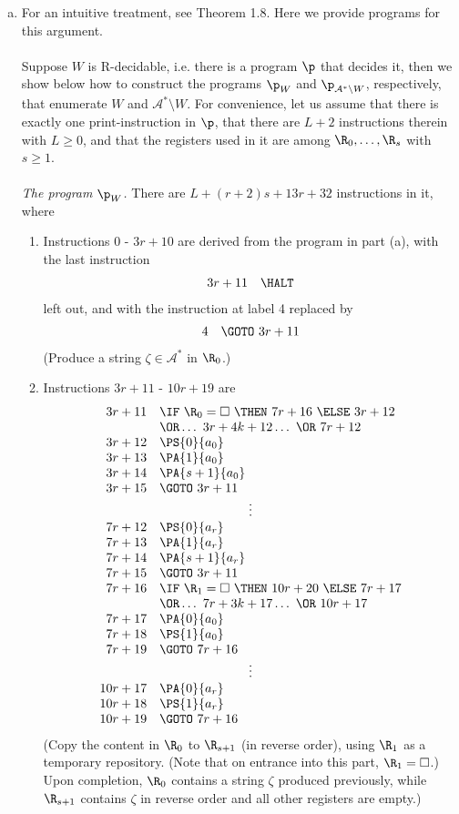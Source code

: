 \begin{enumerate}[1.]
\begin{enumerate}[(a)]
\item For an intuitive treatment, see Theorem 1.8. Here we provide programs for this argument.\\
\ \\
Suppose $W$ is R-decidable, i.e. there is a program $\p$ that decides it, then we show below how to construct the programs $\p_W$ and $\p_{\mathcal{A}^\ast \setminus W}$, respectively, that enumerate $W$ and $\mathcal{A}^\ast \setminus W$. For convenience, let us assume that there is exactly one print-instruction in $\p$, that there are $L + 2$ instructions therein with $L \geq 0$, and that the registers used in it are among $\R_0, \ldots, \R_s$ with $s \geq 1$.\\
\ \\
\emph{The program $\p_W$.} There are $L + (r + 2)s + 13r + 32$ instructions in it, where
\begin{enumerate}[(1)]
\item Instructions $0$ - $3r + 10$ are derived from the program in part (a), with the last instruction
\[
\begin{array}{rl}
3r + 11 & \HALT
\end{array}
\]
left out, and with the instruction at label 4 replaced by
\[
\begin{array}{rl}
4 & \GOTO \ 3r + 11
\end{array}
\]
(Produce a string $\zeta \in \mathcal{A}^\ast$ in $\R_0$.)
\item Instructions $3r + 11$ - $10r + 19$ are
\[
\begin{array}{rl}
3r + 11 & \IF \ \R_0 = \Box \ \THEN \ 7r + 16 \ \ELSE \ 3r + 12 \cr
\ & \OR \ldots \ 3r + 4k + 12 \ldots \ \OR \ 7r + 12 \cr
3r + 12 & \PS{0}{a_0} \cr
3r + 13 & \PA{1}{a_0} \cr
3r + 14 & \PA{s + 1}{a_0} \cr
3r + 15 & \GOTO \ 3r + 11 \cr
\multicolumn{2}{c}{\vdots} \cr
7r + 12 & \PS{0}{a_r} \cr
7r + 13 & \PA{1}{a_r} \cr
7r + 14 & \PA{s + 1}{a_r} \cr
7r + 15 & \GOTO \ 3r + 11 \cr
7r + 16 & \IF \ \R_1 = \Box \ \THEN \ 10r + 20 \ \ELSE \ 7r + 17 \cr
\ & \OR \ldots \ 7r + 3k + 17 \ldots \ \OR \ 10r + 17 \cr
7r + 17 & \PA{0}{a_0} \cr
7r + 18 & \PS{1}{a_0} \cr
7r + 19 & \GOTO \ 7r + 16 \cr
\multicolumn{2}{c}{\vdots} \cr
10r + 17 & \PA{0}{a_r} \cr
10r + 18 & \PS{1}{a_r} \cr
10r + 19 & \GOTO \ 7r + 16 \cr
\end{array}
\]
(Copy the content in $\R_0$ to $\R_{s + 1}$ (in reverse order), using $\R_1$ as a temporary repository. (Note that on entrance into this part, $\R_1 = \Box$.) Upon completion, $\R_0$ contains a string $\zeta$ produced previously, while $\R_{s + 1}$ contains $\zeta$ in reverse order and all other registers are empty.)

\end{enumerate}
\end{enumerate}
\end{enumerate}
